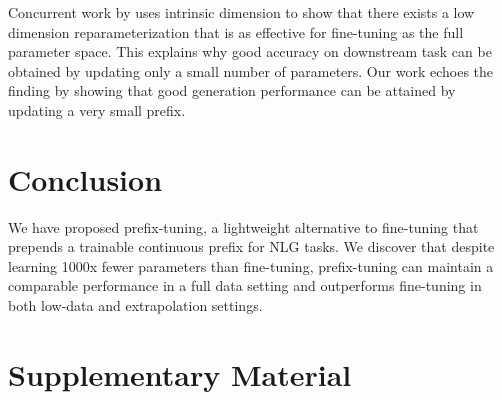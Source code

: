 \documentclass[11pt,a4paper]{article}
\newcommand\pl[1]{\textcolor{red}{[PL: #1]}}
\newcommand\lisa[1]{\textcolor{blue}{[Lisa: #1]}}
\begin{document}

Concurrent work by \citet{aghajanyan2020intrinsic} uses intrinsic dimension to show that there exists a low dimension reparameterization that is as effective for fine-tuning as the full parameter space. 
This explains why good accuracy on downstream task can be obtained by updating only a small number of parameters. Our work echoes the finding by showing that good generation performance can be attained by updating a very small prefix.


\section{Conclusion}

We have proposed prefix-tuning, a lightweight alternative to fine-tuning that prepends a trainable continuous prefix for NLG tasks. 
We discover that despite learning 1000x fewer parameters than fine-tuning, prefix-tuning can maintain a comparable performance in a full data setting and outperforms fine-tuning in both low-data and extrapolation settings.






\clearpage
\newpage
\appendix

\section{Supplementary Material}
\label{sec:appendix}
\end{document}
